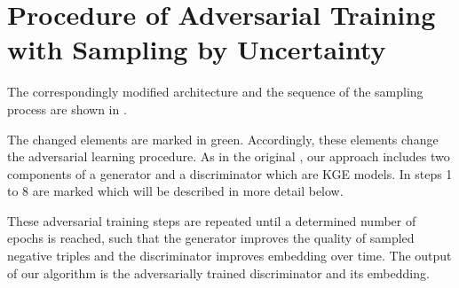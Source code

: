 \section{Procedure of Adversarial Training with Sampling by Uncertainty}
\label{sec:procedure}
%
The correspondingly modified architecture and the sequence of the sampling process are shown in .

The changed elements are marked in green.
Accordingly, these elements change the adversarial learning procedure.
As in the original \kbgan, our approach includes two components of a generator and a discriminator which are \ac{KGE} models.
In  steps 1 to 8 are marked which will be described in more detail below.

















These adversarial training steps are repeated until a determined number of epochs is reached, such that the generator improves the quality of sampled negative triples and the discriminator improves embedding over time.
The output of our algorithm is the adversarially trained discriminator and its embedding.